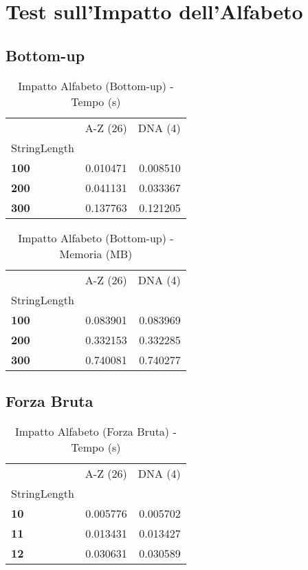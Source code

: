 \documentclass[a4paper, 11pt]{article}
\begin{document}
\section{Test sull'Impatto dell'Alfabeto}

\subsection{Bottom-up}
\begin{center}
\begin{table}[H]
\caption{Impatto Alfabeto (Bottom-up) - Tempo (s)}
\label{tab:impatto_alfabeto_tempo_bottomup}
\begin{tabular}{l|r|r}
\toprule
 & A-Z (26) & DNA (4) \\
StringLength &  &  \\
\midrule
\textbf{100} & 0.010471 & 0.008510 \\
\textbf{200} & 0.041131 & 0.033367 \\
\textbf{300} & 0.137763 & 0.121205 \\
\bottomrule
\end{tabular}
\end{table}
\end{center}

\begin{center}
\begin{table}[H]
\caption{Impatto Alfabeto (Bottom-up) - Memoria (MB)}
\label{tab:impatto_alfabeto_memoria_bottomup}
\begin{tabular}{l|r|r}
\toprule
 & A-Z (26) & DNA (4) \\
StringLength &  &  \\
\midrule
\textbf{100} & 0.083901 & 0.083969 \\
\textbf{200} & 0.332153 & 0.332285 \\
\textbf{300} & 0.740081 & 0.740277 \\
\bottomrule
\end{tabular}
\end{table}
\end{center}


\subsection{Forza Bruta}
\begin{center}
\begin{table}[H]
\caption{Impatto Alfabeto (Forza Bruta) - Tempo (s)}
\label{tab:impatto_alfabeto_tempo_forza_bruta}
\begin{tabular}{l|r|r}
\toprule
 & A-Z (26) & DNA (4) \\
StringLength &  &  \\
\midrule
\textbf{10} & 0.005776 & 0.005702 \\
\textbf{11} & 0.013431 & 0.013427 \\
\textbf{12} & 0.030631 & 0.030589 \\
\bottomrule
\end{tabular}
\end{table}
\end{center}
\end{document}
